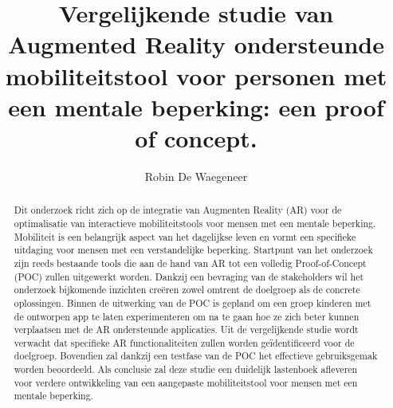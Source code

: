 \documentclass{hogent-article}
\title{Vergelijkende studie van Augmented Reality ondersteunde mobiliteitstool voor personen met een mentale beperking: een proof of concept.}
\author{Robin De Waegeneer}
\begin{document}
\begin{abstract}
    Dit onderzoek richt zich op de integratie van Augmenten Reality (AR) voor de optimalisatie van interactieve mobiliteitstools voor mensen met een mentale beperking. 
    Mobiliteit is een belangrijk aspect van het dagelijkse leven en vormt een specifieke uitdaging voor mensen met een verstandelijke beperking. 
    Startpunt van het onderzoek zijn reeds bestaande tools die aan de hand van AR tot een volledig Proof-of-Concept (POC) zullen uitgewerkt worden. 
    Dankzij een bevraging van de stakeholders wil het onderzoek bijkomende inzichten creëren zowel omtrent de doelgroep als de concrete oplossingen. 
    Binnen de uitwerking van de POC is gepland om een groep kinderen met de ontworpen app te laten experimenteren om na te gaan hoe ze zich beter kunnen verplaatsen met de AR ondersteunde applicaties. 
    Uit de vergelijkende studie wordt verwacht dat specifieke AR functionaliteiten zullen worden geïdentificeerd voor de doelgroep. 
    Bovendien zal dankzij een testfase van de POC het effectieve gebruiksgemak worden beoordeeld. 
    Als conclusie zal deze studie een duidelijk lastenboek afleveren voor verdere ontwikkeling van een aangepaste mobiliteitstool voor mensen met een mentale beperking.
\end{abstract}

\tableofcontents



\printbibliography[heading=bibintoc]
\end{document}
